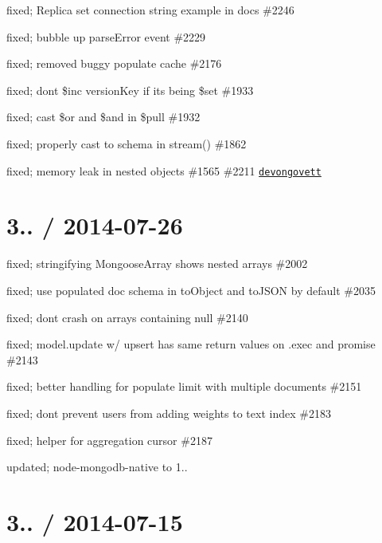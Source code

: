 \begin{DoxyItemize}
\item fixed; Replica set connection string example in docs \#2246
\item fixed; bubble up parse\+Error event \#2229
\item fixed; removed buggy populate cache \#2176
\item fixed; dont \$inc version\+Key if its being \$set \#1933
\item fixed; cast \$or and \$and in \$pull \#1932
\item fixed; properly cast to schema in stream() \#1862
\item fixed; memory leak in nested objects \#1565 \#2211 \href{https://github.com/devongovett}{\tt devongovett}
\end{DoxyItemize}

\section*{3.. / 2014-\/07-\/26 }


\begin{DoxyItemize}
\item fixed; stringifying Mongoose\+Array shows nested arrays \#2002
\item fixed; use populated doc schema in to\+Object and to\+J\+S\+ON by default \#2035
\item fixed; dont crash on arrays containing null \#2140
\item fixed; model.\+update w/ upsert has same return values on .exec and promise \#2143
\item fixed; better handling for populate limit with multiple documents \#2151
\item fixed; dont prevent users from adding weights to text index \#2183
\item fixed; helper for aggregation cursor \#2187
\item updated; node-\/mongodb-\/native to 1..
\end{DoxyItemize}

\section*{3.. / 2014-\/07-\/15 }


